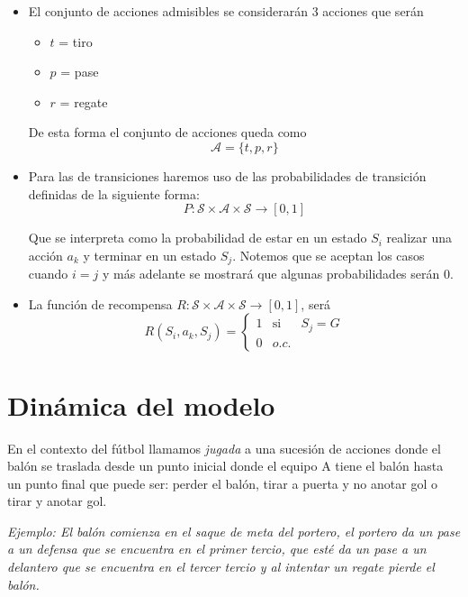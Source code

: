 \documentclass[
  us-letterpaper,
  DIV=11,
  numbers=noendperiod]{scrreprt}
\providecommand{\tightlist}{%
  \setlength{\itemsep}{0pt}\setlength{\parskip}{0pt}}\usepackage{longtable,booktabs,array}
\begin{document}
\begin{itemize}
\item
  El conjunto de acciones admisibles se considerarán 3 acciones que
  serán

  \begin{itemize}
  \tightlist
  \item
    \(t\) = tiro
  \item
    \(p\) = pase
  \item
    \(r\) = regate
  \end{itemize}

  De esta forma el conjunto de acciones queda como
  \[\mathcal{A} = \{t,p,r\}\]
\item
  Para las de transiciones haremos uso de las probabilidades de
  transición definidas de la siguiente forma: \[
   P:\mathcal{S}\times\mathcal{A}\times\mathcal{S} \to [0,1]
   \]

  Que se interpreta como la probabilidad de estar en un estado \(S_i\)
  realizar una acción \(a_k\) y terminar en un estado \(S_j\). Notemos
  que se aceptan los casos cuando \(i=j\) y más adelante se mostrará que
  algunas probabilidades serán 0.
\item
  La función de recompensa
  \(R:\mathcal{S}\times \mathcal{A}\times \mathcal{S}\to[0,1]\), será \[
    R(S_i,a_k,S_j)=\left\{\begin{array}{ccc}
                 1 & \text{si} & S_j=G  \\
                 0 & o.c. &
            \end{array}\right.
    \]
\end{itemize}


\chapter{Dinámica del modelo}\label{dinuxe1mica-del-modelo}

En el contexto del fútbol llamamos \emph{jugada} a una sucesión de
acciones donde el balón se traslada desde un punto inicial donde el
equipo A tiene el balón hasta un punto final que puede ser: perder el
balón, tirar a puerta y no anotar gol o tirar y anotar gol.

\emph{Ejemplo: El balón comienza en el saque de meta del portero, el
portero da un pase a un defensa que se encuentra en el primer tercio,
que esté da un pase a un delantero que se encuentra en el tercer tercio
y al intentar un regate pierde el balón.}
\end{document}
